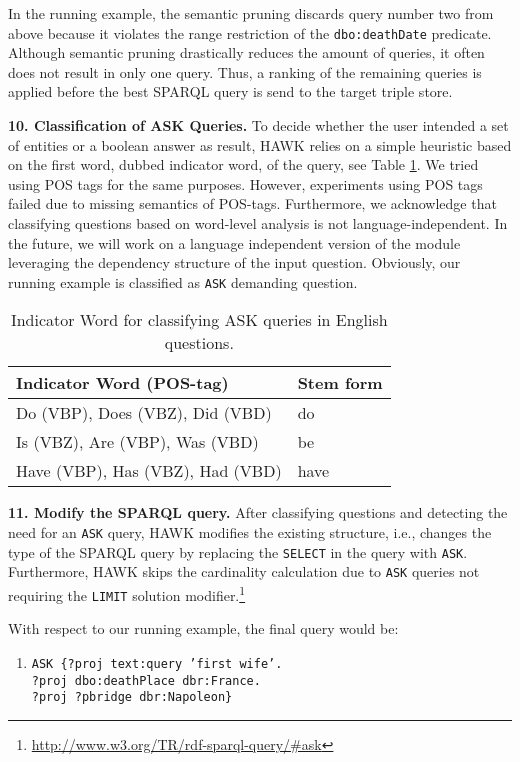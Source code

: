 \documentclass{llncs}
\begin{document}
In the running example, the semantic pruning discards query number two from above because it violates the range restriction of the \texttt{dbo:deathDate} predicate.
Although semantic pruning drastically reduces the amount of queries, it often does not result in only one query. 
Thus, a ranking of the remaining queries is applied before the best SPARQL query is send to the target triple store.

\textbf{10. Classification of ASK Queries.}
To decide whether the user intended a set of entities or a boolean answer as result, HAWK relies on a simple heuristic based on the first word, dubbed indicator word, of the query, see Table \ref{tab:indicator_words}. 
We tried using POS tags for the same purposes. However, experiments using POS tags failed due to missing semantics of POS-tags. 
Furthermore, we acknowledge that classifying questions based on word-level analysis is not language-independent. 
In the future, we will work on a language independent version of the module leveraging the dependency structure of the input question. 
Obviously, our running example is classified as \texttt{ASK} demanding question.

\begin{table}[htb!]
\centering
\caption{Indicator Word for classifying ASK queries in English questions.}
\label{tab:indicator_words}
\begin{tabular}{@{}ll@{}}
\toprule
\textbf{Indicator Word (POS-tag)} & \textbf{Stem form}\\ \midrule
Do (VBP), Does (VBZ), Did (VBD) & do      \\
Is (VBZ), Are (VBP), Was (VBD)  & be        \\
Have (VBP), Has (VBZ), Had (VBD)& have     \\
 \bottomrule
\end{tabular}
\end{table} 

\textbf{11. Modify the SPARQL query.}
After classifying questions  and detecting the need for an \texttt{ASK} query, HAWK modifies the existing structure, i.e., changes the type of the SPARQL query by replacing the \texttt{SELECT} in the query with \texttt{ASK}.
Furthermore, HAWK skips the cardinality calculation due to \texttt{ASK} queries not requiring the \texttt{LIMIT} solution modifier.\footnote{\url{http://www.w3.org/TR/rdf-sparql-query/#ask}} 

With respect to our running example, the final query would be: 
\begin{enumerate}
\item \texttt{ASK \{?proj text:query 'first wife'.\\ ?proj dbo:deathPlace dbr:France.\\ ?proj ?pbridge dbr:Napoleon\}}
\end{enumerate}
\end{document}
